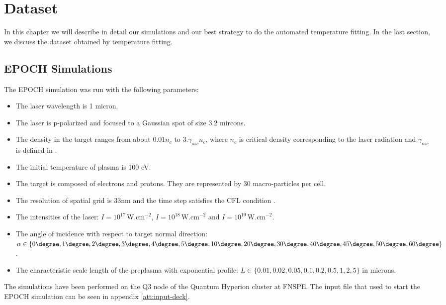 \chapter{Dataset}
\label{ch:dataset}
In this chapter we will describe in detail our simulations and our best strategy to do the automated temperature fitting. In the last section, we discuss the dataset obtained by temperature fitting.
\section{EPOCH Simulations}
The EPOCH simulation was run with the following parameters:
\begin{itemize}
	\item The laser wavelength is 1 micron.
	\item The laser is p-polarized and focused to a Gaussian spot of size $3.2$ mircons.
	\item The density in the target ranges from about $0.01n_c$ to $3.\gamma_{osc}n_c$, where $n_c$ is critical density corresponding to the laser radiation \cite{cui2013} and $\gamma_{osc}$ is defined in \cite{cui2013}.
	\item The initial temperature of plasma is 100 eV.
	\item The target is composed of electrons and protons. They are represented by 30 macro-particles per cell.
	\item The resolution of spatial grid is 33nm and the time step satisfies the CFL condition \cite{arber2015}.
	\item The intensities of the laser: $I=10^{17}\,\mathrm{W.cm}^{-2}$, $I=10^{18} \,\mathrm{W.cm}^{-2}$ and \newline$I=10^{19}\,\mathrm{W.cm}^{-2}$.
	\item The angle of incidence with respect to target normal direction: \newline $\alpha \in \{0\degree,1\degree,2\degree,3\degree,4\degree,5\degree,10\degree,20\degree,30\degree,40\degree,45\degree,50\degree,60\degree\}$.
	\item The characteristic scale length of the preplasma with exponential profile: \newline $L\in\{0.01,0.02,0.05,0.1,0.2,0.5,1,2,5\}$ in microns.
	
\end{itemize}
The simulations have been performed on the Q3 node of the Quantum Hyperion cluster at FNSPE. The input file that used to start the EPOCH simulation can be seen in appendix \ref{att:input-deck}.

